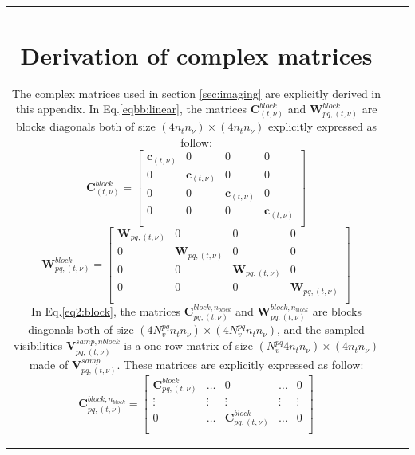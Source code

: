 \documentclass[useAMS,usenatbib]{mn2e}
\begin{document}
\begin{tabular}{*3{c}}
\section[]{Derivation of complex matrices}
\label{app:complexmatrices}
The complex matrices used in section \ref{sec:imaging} are explicitly derived in this appendix. In Eq.\ref{eqbb:linear}, the matrices
$\mathbf{C}_{(t,\nu)}^{block}$ and $\mathbf{W}_{pq,(t,\nu)}^{block}$ are blocks diagonals  both of size $(4n_t n_{\nu})\times(4n_t 
n_{\nu})$ explicitly expressed as follow:
\begin{equation*}
\mathbf{C}_{(t,\nu)}^{block}=
  \begin{bmatrix}
    \mathbf{c}_{(t,\nu)} & 0 & 0 & 0\\
    0 &  \mathbf{c}_{(t,\nu)} &0 & 0 \\
    0 & 0 & \mathbf{c}_{(t,\nu)} & 0\\
      0 & 0 & 0 & \mathbf{c}_{(t,\nu)}\\
  \end{bmatrix}
\end{equation*}
\begin{equation*}
\mathbf{W}_{pq,(t,\nu)}^{block}=
  \begin{bmatrix}
    \mathbf{W}_{pq,(t,\nu)}& 0 & 0 & 0\\
    0 &  \mathbf{W}_{pq,(t,\nu)} &0 & 0 \\
    0 & 0 & \mathbf{W}_{pq,(t,\nu)} & 0\\
      0 & 0 & 0 & \mathbf{W}_{pq,(t,\nu)}\\
  \end{bmatrix}
\end{equation*}
In Eq.\ref{eq2:block}, the matrices $\mathbf{C}_{pq,(t,\nu)}^{block,n_{block}}$ and 
$\mathbf{W}_{pq,(t,\nu)}^{block,n_{block}}$ are blocks diagonals both of size $(4N_v^{pq}n_t n_{\nu})\times (4N_v^{pq}n_t n_{\nu})$, and 
the sampled visibilities $\mathbf{V}_{pq,(t,\nu)}^{samp,nblock}$ is a one row matrix of size $(N_v^{pq}4 n_t n_{\nu})\times (4 n_t 
n_{\nu})$ 
made of $\textbf{V}_{pq,(t,\nu)}^{samp}$. These matrices are explicitly expressed as follow:
\begin{equation*}
\mathbf{C}_{pq,(t,\nu)}^{block,n_{block}}=
  \begin{bmatrix}
    \mathbf{C}_{pq,(t,\nu)}^{block} &\dots & 0 & \dots & 0\\
    \vdots & \vdots & \vdots & \vdots & \vdots\\
    0 & \dots& \mathbf{C}_{pq,(t,\nu)}^{block} &\dots & 0\\

\end{bmatrix}
\end{equation*}
\end{tabular}
\end{document}
